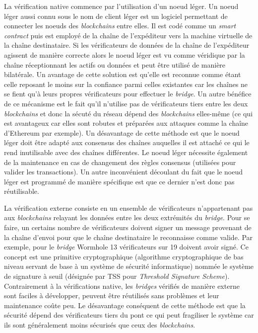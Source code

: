 La vérification native commence par l’utilisation d’un \gls{noeud léger}. \cite{NomadDocsNative} Un noeud léger aussi connu sous le nom de client léger est un logiciel permettant de connecter les noeuds des \textit{\gls{blockchain}s} entre elles. Il est codé comme un \textit{\gls{smart contract}} puis est employé de la chaîne de l'expéditeur vers la machine virtuelle de la chaîne destinataire. Si les \gls{vérificateur}s de données de la chaîne de l'expéditeur agissent de manière correcte alors le noeud léger est vu comme véridique par la chaîne réceptionnant les \gls{actif}s ou données et peut être utilisé de manière bilatérale.
 Un avantage de cette solution est qu’elle est reconnue comme étant celle reposant le moins sur la confiance parmi celles existantes car les chaînes ne se fient qu’à leurs propres \gls{vérificateur}s pour effectuer le \textit{bridge}. Un autre bénéfice de ce mécanisme est le fait qu’il n’utilise pas de \gls{vérificateur}s tiers entre les deux \textit{\gls{blockchain}s} et donc la sécuté du réseau dépend des \textit{\gls{blockchain}s} elles-même (ce qui est avantageux car elles sont robutes et préparées aux attaques comme la chaîne d’Ethereum par exemple).
 Un désavantage de cette méthode est que le noeud léger doit être adapté aux consensus des chaînes auquelles il est attaché ce qui le rend inutilisable avec des chaînes différentes. Le noeud léger nécessite également de la maintenance en cas de changement des règles consensus (utilisées pour valider les transactions). Un autre inconvénient découlant du fait que le noeud léger est programmé de manière spécifique est que ce dernier n’est donc pas réutilisable. \\

\pagebreak

La vérification externe consiste en un ensemble de \gls{vérificateur}s n’appartenant pas aux \textit{\gls{blockchain}s} relayant les données entre les deux extrémités du \textit{bridge}. Pour se faire, un certains nombre de \gls{vérificateur}s doivent signer un message provenant de la chaîne d’envoi pour que le chaîne destinataire le reconnaisse comme valide. Par exemple, pour le \textit{bridge} \gls{Wormhole} 13 \gls{vérificateur}s sur 19 doivent avoir signé\cite{NomadDocsExternal}. Ce concept est une primitive cryptographique (algorithme cryptographique de bas niveau servant de base à un système de sécurité informatique) nommée le système de signature à seuil (désignée par TSS pour \textit{Threshold Signature Scheme})\cite{BinanceTSS}. 
Contrairement à la vérifications native, les \textit{bridges} vérifiés de manière externe sont faciles à développer, peuvent être réutilisés sans problèmes et leur maintenance coûte peu. Le désavantage conséquent de cette méthode est que la sécurité dépend des \gls{vérificateur}s tiers du pont ce qui peut fragiliser le système car ils sont généralement moins sécurisés que ceux des \textit{\gls{blockchain}s}. \\


